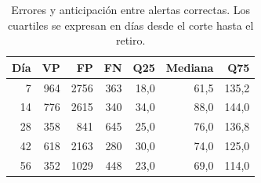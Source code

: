 \begin{table}[!htbp]\centering
\caption{Errores y anticipación entre alertas correctas. Los cuartiles se expresan en días desde el corte hasta el retiro.}\label{res:anticipacion}
\begin{tabular}{rrrrrrr}
\toprule
Día & VP & FP & FN & Q25 & Mediana & Q75\\
\midrule
7 & 964 & 2756 & 363 & 18,0 & 61,5 & 135,2\\
14 & 776 & 2615 & 340 & 34,0 & 88,0 & 144,0\\
28 & 358 & 841 & 645 & 25,0 & 76,0 & 136,8\\
42 & 618 & 2163 & 280 & 30,0 & 74,0 & 125,0\\
56 & 352 & 1029 & 448 & 23,0 & 69,0 & 114,0\\
\bottomrule
\end{tabular}
\end{table}
